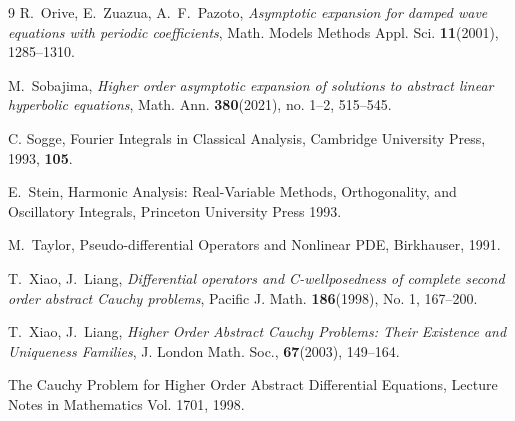 \documentclass[11pt]{amsart}
\numberwithin{equation}{section}
\theoremstyle{remark}
\theoremstyle{definition}
\begin{document}
\begin{thebibliography}{9}
	 R.\ Orive, E.\ Zuazua, A.\ F.\ Pazoto,  \textit{Asymptotic expansion for damped wave equations with periodic
	coefficients}, Math. Models Methods Appl. Sci. \textbf{11}(2001), 1285--1310. 
	
    M.\ Sobajima, \textit{Higher order asymptotic expansion of solutions to abstract linear hyperbolic equations}, Math. Ann. \textbf{380}(2021), no. 1--2, 515--545.
	
	 C. Sogge, Fourier Integrals in Classical Analysis, Cambridge University Press, 1993, \textbf{105}.
	
   E.\ Stein, Harmonic Analysis: Real-Variable Methods, Orthogonality, and Oscillatory Integrals, Princeton University Press 1993.
	
	
	 M.\ Taylor,  Pseudo-differential Operators and Nonlinear PDE, Birkhauser, 1991.
	
	 T.\ Xiao, J.\ Liang, \textit{
		Differential operators and C-wellposedness of complete second order abstract Cauchy problems}, Pacific J. Math.  \textbf{186}(1998), No. 1, 167--200.
		
 T.\ Xiao, J.\ Liang, \textit{Higher Order Abstract Cauchy Problems: Their Existence and Uniqueness Families}, J. London Math. Soc., \textbf{67}(2003), 149--164.

 The Cauchy Problem for Higher Order Abstract Differential Equations, Lecture Notes in Mathematics Vol. 1701, 1998.

\end{thebibliography}
\end{document}
